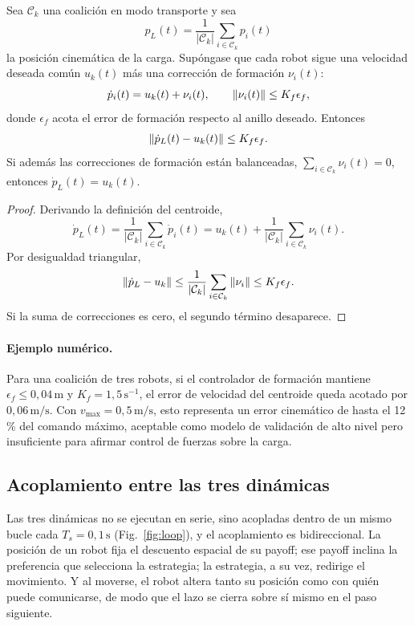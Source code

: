 \begin{lema}
\label{lema:transporte_cinematico}
Sea $\mathcal{C}_k$ una coalición en modo transporte y sea
\[
  p_L(t)=\frac{1}{|\mathcal{C}_k|}\sum_{i\in\mathcal{C}_k}p_i(t)
\]
la posición cinemática de la carga. Supóngase que cada robot sigue una velocidad
deseada común $u_k(t)$ más una corrección de formación $\nu_i(t)$:
\[
  \dot p_i(t)=u_k(t)+\nu_i(t),
  \qquad
  \left\|\nu_i(t)\right\|\le K_f\epsilon_f,
\]
donde $\epsilon_f$ acota el error de formación respecto al anillo deseado. Entonces
\begin{equation}
  \left\|\dot p_L(t)-u_k(t)\right\|
  \le
  K_f\epsilon_f.
  \label{eq:transporte_cinematico}
\end{equation}
Si además las correcciones de formación están balanceadas,
$\sum_{i\in\mathcal{C}_k}\nu_i(t)=0$, entonces $\dot p_L(t)=u_k(t)$.
\end{lema}

\begin{proof}
Derivando la definición del centroide,
\[
  \dot p_L(t)
  =
  \frac{1}{|\mathcal{C}_k|}
  \sum_{i\in\mathcal{C}_k}\dot p_i(t)
  =
  u_k(t)+
  \frac{1}{|\mathcal{C}_k|}
  \sum_{i\in\mathcal{C}_k}\nu_i(t).
\]
Por desigualdad triangular,
\[
  \left\|\dot p_L-u_k\right\|
  \le
  \frac{1}{|\mathcal{C}_k|}
  \sum_{i\in\mathcal{C}_k}\left\|\nu_i\right\|
  \le
  K_f\epsilon_f.
\]
Si la suma de correcciones es cero, el segundo término desaparece.
\end{proof}

\paragraph{Ejemplo numérico.}
Para una coalición de tres robots, si el controlador de formación mantiene
$\epsilon_f\le0{,}04\,\text{m}$ y $K_f=1{,}5\,\text{s}^{-1}$, el error de velocidad
del centroide queda acotado por $0{,}06\,\text{m/s}$. Con $v_{\max}=0{,}5\,\text{m/s}$,
esto representa un error cinemático de hasta el 12\,\% del comando máximo, aceptable
como modelo de validación de alto nivel pero insuficiente para afirmar control de
fuerzas sobre la carga.

\subsection{Acoplamiento entre las tres dinámicas}
\label{subsec:acoplamiento}

Las tres dinámicas no se ejecutan en serie, sino acopladas dentro de un mismo bucle
cada $T_s = 0{,}1\,\text{s}$ (Fig.~\ref{fig:loop}), y el acoplamiento es bidireccional.
La posición de un robot fija el descuento espacial de su payoff; ese payoff inclina la
preferencia que selecciona la estrategia; la estrategia, a su vez, redirige el
movimiento. Y al moverse, el robot altera tanto su posición como con quién puede
comunicarse, de modo que el lazo se cierra sobre sí mismo en el paso siguiente.


